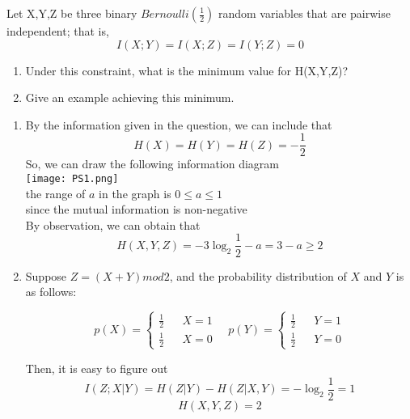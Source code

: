 \documentclass[12pt]{article}
\newenvironment{solution}[2][Solution]{\begin{trivlist}
\item[\hskip \labelsep {\bfseries #1}]}{\end{trivlist}}
\newenvironment{problem}[2][Problem]{\begin{trivlist}
\item[\hskip \labelsep {\bfseries #1}\hskip \labelsep {\bfseries #2.}]}{\end{trivlist}}
\begin{document}
\begin{problem}{4 Entropy and Pairwise independence}
    \item Let X,Y,Z be three binary $Bernoulli\left(\frac{1}{2}\right)$ random variables that are pairwise independent; that is, 
    $$I(X;Y)=I(X;Z)=I(Y;Z)=0$$
    \begin{enumerate}[label=\alph*)]
        \item 
        Under this constraint, what is the minimum value for H(X,Y,Z)?
        \item
        Give an example achieving this minimum.
    \end{enumerate}    
\end{problem}

\begin{solution}{}
    \begin{enumerate}[label=\alph*)]
        \item 
        By the information given in the question, we can include that
        $$H(X)=H(Y)=H(Z)=-\frac{1}{2}$$
        So, we can draw the following information diagram\\
        \texttt{[image: PS1.png]}\\
        the range of $a$ in the graph is $0\leq a\leq1$\\
        since the mutual information is non-negative\\
        By observation, we can obtain that
        $$H(X,Y,Z)=-3\log_2\frac{1}{2}-a=3-a\geq 2 $$
        \item
            Suppose $Z=(X+Y)mod2$, and the probability distribution of $X$ and $Y$ is as follows:
            \begin{spacing}{1.5}
            $$p(X)=\left\{
            \begin{array}{rcl}
            \frac{1}{2} & & {X=1} \\
            \frac{1}{2} & & {X=0} 
            \end{array}
            \right.
            \quad
            p(Y)=\left\{
            \begin{array}{rcl}
            \frac{1}{2} & & {Y=1} \\
            \frac{1}{2} & & {Y=0} 
            \end{array}
            \right.
            $$
            \end{spacing}
            Then, it is easy to figure out 
            $$I(Z;X|Y)=H(Z|Y)-H(Z|X,Y)=-\log_2\frac{1}{2}=1$$
            $$H(X,Y,Z)=2$$
    \end{enumerate}
\end{solution}
\newpage
\end{document}
